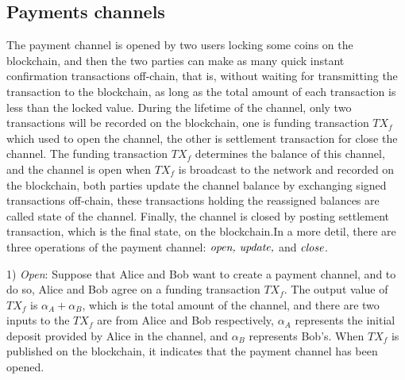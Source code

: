 \documentclass[conference]{IEEEtran}
\begin{document}
\subsection{Payments channels}
The payment channel is opened by two users locking some coins on the blockchain, and then the two parties can make as many quick instant confirmation transactions off-chain, that is, without waiting for transmitting the transaction to the blockchain, as long as the total amount of each transaction is less than the locked value. During the lifetime of the channel, only two transactions will be recorded on the blockchain, one is funding transaction $TX_f$ which used to open the channel, the other is settlement 
transaction for close the channel. The funding transaction $TX_f$ determines the balance of this channel, and the channel is open when $TX_f$ is broadcast to the network and recorded on the blockchain, both parties update the channel balance by exchanging signed transactions off-chain, these transactions holding the reassigned balances are called state of the channel. Finally, the channel is closed by posting settlement transaction, which is the final state, on the blockchain.In a more detil, there are three 
operations of the payment channel: $\emph{open, update,}$ and  $\emph{close}$.

1) \emph{Open}: Suppose that Alice and Bob want to create a payment channel, and to do so, Alice and Bob agree on a funding transaction $TX_f$. The output value of $TX_f$ is $\alpha_A+\alpha_B$, which is the total amount of the channel, and there are two inputs to the $TX_f$ are from Alice and Bob respectively, $\alpha_A$ represents the initial deposit provided by Alice in the channel, and $\alpha_B$ represents Bob's. When $TX_f$ is published on the blockchain, it indicates that the payment channel has been opened.
\end{document}

